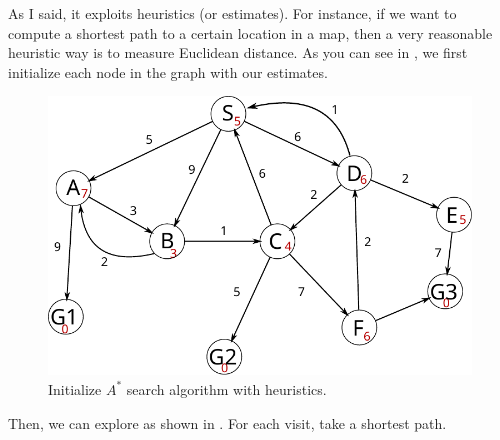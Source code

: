 As I said, it exploits heuristics (or estimates). For instance, if we want to compute a shortest path to a certain location in a map, then a very reasonable heuristic way is to measure Euclidean distance. As you can see in , we first initialize each node in the graph with our estimates. 

\begin{figure}[h]
	\centering
	\includegraphics[scale=0.73]{./images/search_alg/astar_prob.pdf}
	\caption{Initialize $A^*$ search algorithm with heuristics.}
	\label{fig:astar_start}
\end{figure}

Then, we can explore as shown in . For each visit, take a shortest path. 

